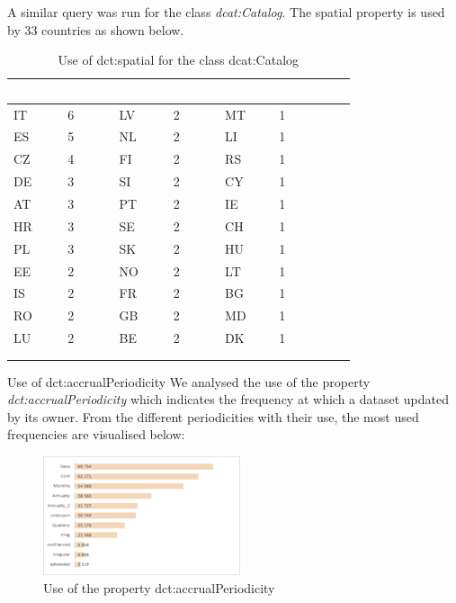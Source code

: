 \documentclass[<options>]{elsarticle}
\begin{document}
A similar query was run for the class \textit{dcat:Catalog}. The spatial property is used by 33 countries as shown below.

\begin{longtable}{*8l}
\rowcolor{blue!90}
\textcolor{white}{\textbf{spatial}} & \textcolor{white}{\textbf{Count}} & \textcolor{white}{\textbf{spatial}} & \textcolor{white}{\textbf{Count}} & \textcolor{white}{\textbf{spatial}} & \textcolor{white}{\textbf{Count}} \\ \hline
\rowcolor{gray!10} IT &6 &LV &2 &MT &1 \\ \hline
\rowcolor{gray!10} ES &5 &NL &2 &LI &1 \\ \hline
\rowcolor{gray!10} CZ &4 &FI &2 &RS &1 \\ \hline
\rowcolor{gray!10} DE &3 &SI &2 &CY &1 \\ \hline
\rowcolor{gray!10} AT &3 &PT &2 &IE &1 \\ \hline
\rowcolor{gray!10} HR &3 &SE &2 &CH &1 \\ \hline
\rowcolor{gray!10} PL &3 &SK &2 &HU &1 \\ \hline
\rowcolor{gray!10} EE &2 &NO &2 &LT &1 \\ \hline
\rowcolor{gray!10} IS &2 &FR &2 &BG &1 \\ \hline
\rowcolor{gray!10} RO &2 &GB &2 &MD &1 \\ \hline
\rowcolor{gray!10} LU &2 &BE &2 &DK &1 \\ \hline
\\ 
\caption{Use of dct:spatial for the class dcat:Catalog}
\end{longtable}

Use of dct:accrualPeriodicity
We analysed the use of the property \textit{dct:accrualPeriodicity} which indicates the frequency at which a dataset updated by its owner. From the different periodicities with their use, the most used frequencies are visualised below:

\begin{figure}[!h]
\includegraphics{replace22.png}
\caption{Use of the property dct:accrualPeriodicity}
\end{figure}
\end{document}
